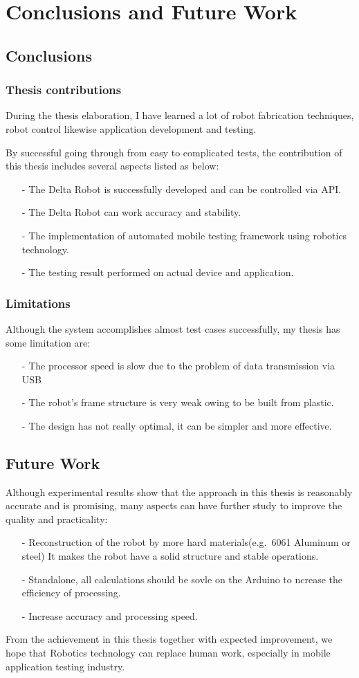 \chapter{Conclusions and Future Work}

\section{Conclusions}
	\subsection{Thesis contributions}
	During the thesis elaboration, I have learned a lot of robot fabrication techniques, robot control likewise application development and testing.

	By successful going through from easy to complicated tests, the contribution of this thesis includes several aspects listed as below:
	\begin{itemize}
		\item[-] The Delta Robot is successfully developed and can be controlled via API.
		\item[-] The Delta Robot can work accuracy and stability.
		\item[-] The implementation of automated mobile testing framework using robotics technology.
		\item[-] The testing result performed on actual device and application.
	\end{itemize}
	\subsection{Limitations}
	Although the system accomplishes almost test cases successfully, my thesis has some limitation are:
	\begin{itemize}
		\item[-] The processor speed is slow due to the problem of data transmission via USB
		\item[-] The robot's frame structure is very weak owing to be built from plastic.
		\item[-] The design has not really optimal, it can be simpler and more effective.
	\end{itemize}

\section{Future Work}
	
	Although experimental results show that the approach in this thesis is reasonably accurate and is promising, many aspects can have further study to improve the quality and practicality:
	\begin{itemize}
		\item[-] Reconstruction of the robot by more hard materials(e.g.\ 6061 Aluminum or steel) It makes the robot have a solid structure and stable operations.
		\item[-] Standalone, all calculations should be sovle on the Arduino to ncrease the efficiency of processing.
		\item[-] Increase accuracy and processing speed.
	\end{itemize}

	From the achievement in this thesis together with expected improvement, we hope that Robotics technology can replace human work, especially in mobile application testing industry.
